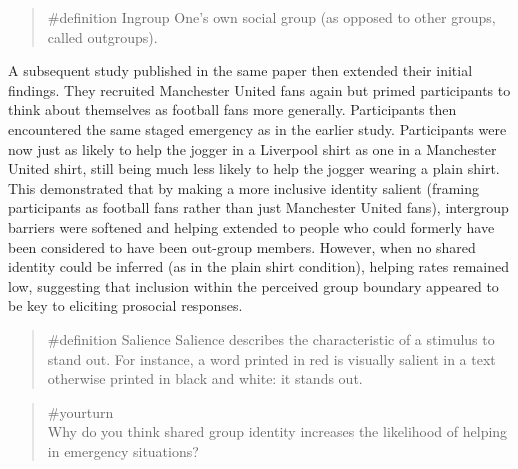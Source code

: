 \documentclass[
  letterpaper,
]{book}
\begin{document}
\begin{quote}
\label{def-ingroup}{\#definition} Ingroup One's own
social group (as opposed to other groups, called outgroups).
\end{quote}

A subsequent study published in the same paper then extended their
initial findings. They recruited Manchester United fans again but primed
participants to think about themselves as football fans more generally.
Participants then encountered the same staged emergency as in the
earlier study. Participants were now just as likely to help the jogger
in a Liverpool shirt as one in a Manchester United shirt, still being
much less likely to help the jogger wearing a plain shirt. This
demonstrated that by making a more inclusive identity salient (framing
participants as football fans rather than just Manchester United fans),
intergroup barriers were softened and helping extended to people who
could formerly have been considered to have been out-group members.
However, when no shared identity could be inferred (as in the plain
shirt condition), helping rates remained low, suggesting that inclusion
within the perceived group boundary appeared to be key to eliciting
prosocial responses.

\begin{quote}
\label{def-salience}{\#definition} Salience Salience
describes the characteristic of a stimulus to stand out. For instance, a
word printed in red is visually salient in a text otherwise printed in
black and white: it stands out.
\end{quote}

\begin{quote}
{\#yourturn}\\
Why do you think shared group identity increases the likelihood of
helping in emergency situations?
\end{quote}
\end{document}
